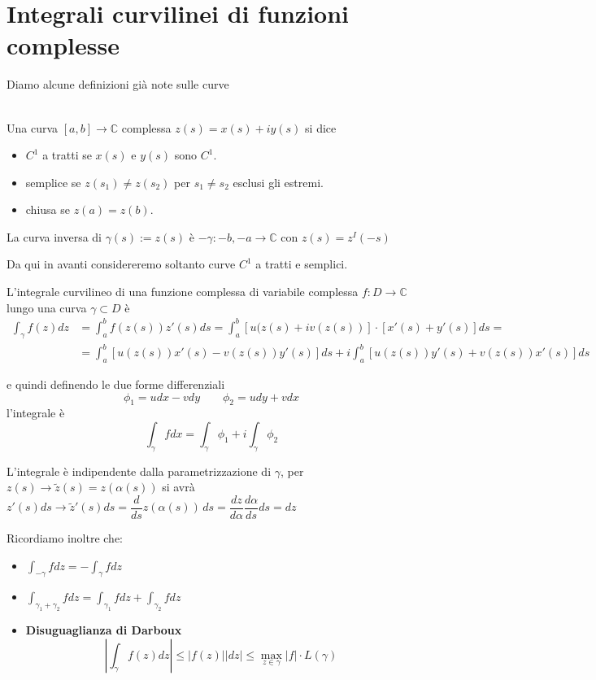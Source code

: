 \documentclass[11pt,a4paper,twoside]{book}
\newenvironment{definizione}[1][\empty]{\begin{Definizione}{
\ifx\empty#1\relax\else\mdseries\itshape#1\\\fi
}{}}{\end{Definizione}}
\theoremstyle{esss}
\theoremstyle{dotless}
\numberwithin{equation}{section} %
\begin{document}
\section{Integrali curvilinei di funzioni complesse}

Diamo alcune definizioni già note sulle curve

\begin{definizione}
Una curva $[a,b]\rightarrow\mathbb{C}$ complessa $z(s)=x(s)+iy(s)$ si dice
\begin{itemize}
\item $C^1$ a tratti se $x(s)$ e $y(s)$ sono $C^1$.
\item semplice se $z(s_1)\neq z(s_2)$ per $ s_1\neq s_2$ esclusi gli estremi.
\item chiusa se $z(a)=z(b)$.
\end{itemize}
La curva inversa di $\gamma(s):=z(s)$ è $-\gamma:{-b,-a}\rightarrow\mathbb{C}$ con $z(s)=z^I(-s)$
\end{definizione}

Da qui in avanti considereremo soltanto curve $C^1$ a tratti e semplici.

L'integrale curvilineo di una funzione complessa di variabile complessa $f:D\rightarrow\mathbb{C}$ lungo una curva $\gamma\subset D$ è
\begin{align*}
\int_\gamma f(z)dz &= \int_a^b f(z(s))z'(s) ds= \int_a^b [u(z(s) +iv(z(s))] \cdot [x'(s)+y'(s)] ds =\\
&=\int_a^b \left[ u(z(s)) x'(s) -v(z(s))y'(s) \right] ds + i\int_a^b \left[u(z(s))y'(s)+v(z(s))x'(s) \right] ds
\end{align*}

e quindi definendo le due forme differenziali
\[
\phi_1=udx-vdy \qquad \phi_2=udy+vdx
\]
l'integrale è
\[
\int_\gamma f dx = \int_\gamma \phi_1 +i\int_\gamma \phi_2
\]

L'integrale è indipendente dalla parametrizzazione di $\gamma$, per $z(s)\rightarrow \tilde{z}(s)=z(\alpha(s))$ si avrà $z'(s)ds\rightarrow \tilde{z}'(s)ds=\dfrac{d}{ds} z(\alpha(s)) \,ds=\dfrac{dz}{d\alpha}\dfrac{d\alpha}{ds}ds=dz$

Ricordiamo inoltre che:\begin{itemize}[label=$\cdot$]
\item $\int_{-\gamma}f dz=-\int_\gamma f dz$
\item $\int_{\gamma_1+\gamma_2}fdz=\int_{\gamma_1}fdz+\int_{\gamma_2}fdz$
\item {\bfseries Disuguaglianza di Darboux} 
\[
\left| \int_\gamma f(z) dz \right|\leq \left| f(z)\right| |dz| \leq \max_{z\in\gamma}{|f|} \cdot L(\gamma)
\]
\end{itemize}
\end{document}
